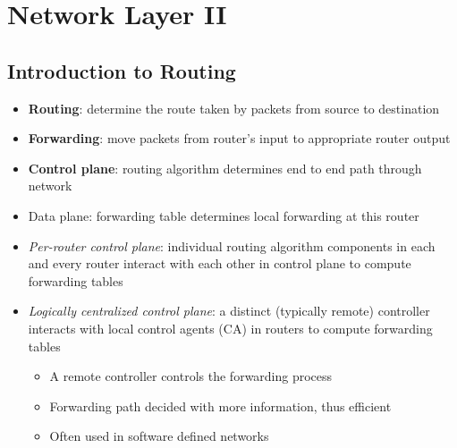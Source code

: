 \section{Network Layer II}
\subsection{Introduction to Routing}
\begin{itemize}
	\item \textbf{Routing}: determine the route taken by packets from source to destination
	\item \textbf{Forwarding}: move packets from router's input to appropriate router output
	\item \textbf{Control plane}: routing algorithm determines end to end path through network
	\item Data plane: forwarding table determines local forwarding at this router
	\item \textit{Per-router control plane}: individual routing algorithm components in each and every router interact with each other in control plane to compute forwarding tables
	\item \textit{Logically centralized control plane}: a distinct (typically remote) controller interacts with local control agents (CA) in routers to compute forwarding tables
	\begin{itemize}
		\item A remote controller controls the forwarding process
		\item Forwarding path decided with more information, thus efficient
		\item Often used in software defined networks
	\end{itemize}
\end{itemize}

